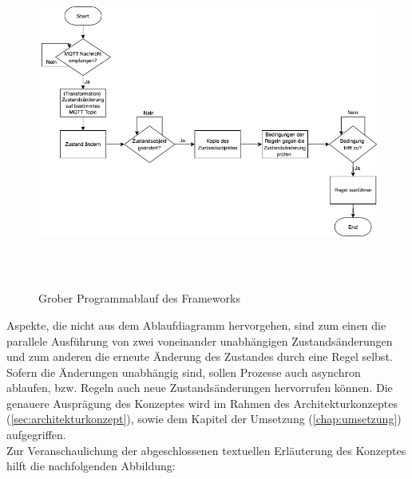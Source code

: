         \begin{figure}[hbt!]
            \centering
            \includegraphics[width=14cm,height=11cm,keepaspectratio]{images/Programmablauf_Framework.png}
            \caption{Grober Programmablauf des Frameworks}
            \label{fig:programmablauf_framework}
        \end{figure}
        Aspekte, die nicht aus dem Ablaufdiagramm hervorgehen, sind zum einen die parallele Ausführung von zwei voneinander unabhängigen 
        Zustandsänderungen und zum anderen die erneute Änderung des Zustandes durch eine Regel selbst. Sofern die Änderungen unabhängig 
        sind, sollen Prozesse auch asynchron ablaufen, bzw. Regeln auch neue Zustandsänderungen hervorrufen können.  Die genauere Ausprägung des 
        Konzeptes wird im Rahmen des Architekturkonzeptes (\ref{sec:architekturkonzept}), sowie dem Kapitel der Umsetzung 
        (\ref{chap:umsetzung}) aufgegriffen. 
        \\
        \linebreak
        Zur Veranschaulichung der abgeschlossenen textuellen Erläuterung des Konzeptes hilft die nachfolgenden Abbildung: 
        